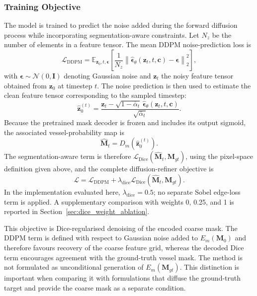 \documentclass[jimaging,article,submit,pdftex,moreauthors]
  {Definitions/mdpi}
\begin{document}
\subsubsection{Training Objective}

The model is trained to predict the noise added during the forward diffusion process while incorporating segmentation-aware constraints. Let $N_z$ be the number of elements in a feature tensor. The mean DDPM noise-prediction loss is
\begin{equation}
\mathcal{L}_{\text{DDPM}}=
\mathbb{E}_{\mathbf{z}_0,t,\boldsymbol{\epsilon}}\left[
\frac{1}{N_z}\left\|
\hat{\boldsymbol{\epsilon}}_\theta(\mathbf{z}_t,t,\mathbf{c})-
\boldsymbol{\epsilon}
\right\|_2^2
\right],
\end{equation}
with $\boldsymbol{\epsilon}\sim\mathcal{N}(0,\mathbf{I})$ denoting Gaussian noise and $\mathbf{z}_t$ the noisy feature tensor obtained from $\mathbf{z}_0$ at timestep $t$.
The noise prediction is then used to estimate the clean feature tensor corresponding to the sampled timestep:
\begin{equation}
\hat{\mathbf{z}}_0^{(t)}=
\frac{\mathbf{z}_t-
\sqrt{1-\bar{\alpha}_t}\,
\hat{\boldsymbol{\epsilon}}_\theta(\mathbf{z}_t,t,\mathbf{c})}
{\sqrt{\bar{\alpha}_t}}.
\end{equation}
Because the pretrained mask decoder is frozen and includes its output sigmoid, the associated vessel-probability map is
\begin{equation}
\hat{\mathbf{M}}_t=D_m\!\left(\hat{\mathbf{z}}_0^{(t)}\right).
\end{equation}
The segmentation-aware term is therefore $\mathcal{L}_{\text{Dice}}(\hat{\mathbf{M}}_t,\mathbf{M}_{gt})$, using the pixel-space definition given above, and the complete diffusion-refiner objective is
\begin{equation}
\mathcal{L}=
\mathcal{L}_{\text{DDPM}}+
\lambda_{\text{dice}}
\mathcal{L}_{\text{Dice}}(\hat{\mathbf{M}}_t,\mathbf{M}_{gt}).
\end{equation}
In the implementation evaluated here, $\lambda_{\text{dice}}=0.5$; no separate Sobel edge-loss term is applied. A supplementary comparison with weights 0, 0.25, and 1 is reported in Section~\ref{sec:dice_weight_ablation}.

This objective is Dice-regularised denoising of the encoded coarse mask. The DDPM term is defined with respect to Gaussian noise added to $E_m(\mathbf{M}_0)$ and therefore favours recovery of the coarse feature grid, whereas the decoded Dice term encourages agreement with the ground-truth vessel mask. The method is not formulated as unconditional generation of $E_m(\mathbf{M}_{gt})$. This distinction is important when comparing it with formulations that diffuse the ground-truth target and provide the coarse mask as a separate condition.
\end{document}
